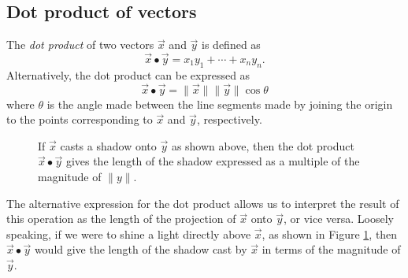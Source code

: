 \documentclass[../book.tex]{subfiles}
\begin{document}
\subsection{Dot product of vectors}

The \emph{dot product} of two vectors \(\vec{x}\) and \(\vec{y}\) is defined as
\begin{equation}\label{eq:vec-10}
\vec{x} \bullet \vec{y} = x_1 y_1 + \cdots + x_n y_n.
\end{equation}
Alternatively, the dot product can be expressed as
\begin{equation}\label{eq:vec-11}
\vec{x} \bullet \vec{y} = \| \vec{x}\|  \| \vec{y}\|  \cos \theta
\end{equation}
where \(\theta\) is the angle made between the line segments made by joining the origin to the points corresponding to \(\vec{x}\) and \(\vec{y}\), respectively.

\begin{figure}[htbp]
  \centering
  \caption{If \(\vec{x}\) casts a shadow onto \(\vec{y}\) as shown above, then the dot product \(\vec{x}\bullet \vec{y}\) gives the length of the shadow expressed as a multiple of the magnitude of \(\| y\|\).}
  \label{fig:dotprod}
\end{figure}

The alternative expression for the dot product allows us to interpret the result of this operation as the length of the projection of \(\vec{x}\) onto \(\vec{y}\), or vice versa. Loosely speaking, if we were to shine a light directly above \(\vec{x}\), as shown in Figure \ref{fig:dotprod}, then \(\vec{x} \bullet \vec{y}\) would give the length of the shadow cast by \(\vec{x}\) in terms of the magnitude of \(\vec{y}\).
\end{document}
